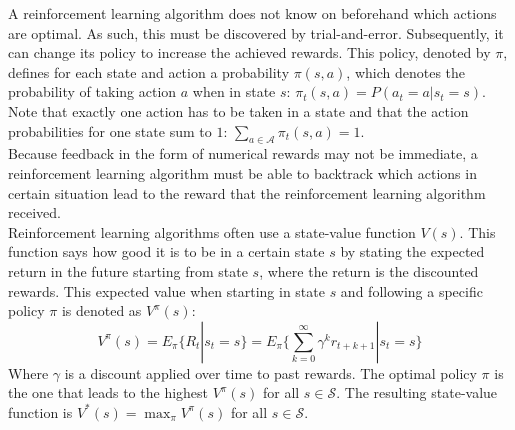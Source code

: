 \documentclass[a4paper, 11pt]{article}
\begin{document}
A reinforcement learning algorithm does not know on beforehand which actions are optimal. As such, this must be discovered by trial-and-error. Subsequently, it can change its policy to increase the achieved rewards. This policy, denoted by $\pi$, defines for each state and action a probability $\pi(s,a)$, which denotes the probability of taking action $a$ when in state $s$: $\pi_t(s,a) = P(a_t = a \vert s_t = s)$. Note that exactly one action has to be taken in a state and that the action probabilities for one state sum to $1$: $\sum_{a\in \mathcal{A}}\pi_t(s,a)=1$.\\
Because feedback in the form of numerical rewards may not be immediate, a reinforcement learning algorithm must be able to backtrack which actions in certain situation lead to the reward that the reinforcement learning algorithm received.\\

Reinforcement learning algorithms often use a state-value function $V(s)$. This function says how good it is to be in a certain state $s$ by stating the expected return in the future starting from state $s$, where the return is the discounted rewards. This expected value when starting in state $s$ and following a specific policy $\pi$ is denoted as $V^\pi(s)$:
\begin{equation}
\label{eq:vpolicy}
V^\pi(s) = E_\pi\{R_t|s_t=s\}=E_\pi\big \{ \sum_{k=0}^{\infty}\gamma^k r_{t+k+1} | s_t=s\big \}
\end{equation}
Where $\gamma$ is a discount applied over time to past rewards. The optimal policy $\pi$ is the one that leads to the highest $V^\pi(s)$ for all $s \in \mathcal{S}$. The resulting state-value function is $V^*(s) = \max_\pi V^\pi(s)$ for all $s \in \mathcal{S}$.

\end{document}
